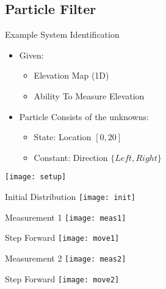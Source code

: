 \subsection{Particle Filter}
\begin{frame}{Example System Identification}
\begin{itemize}
\item Given:
    \begin{itemize}
    \item Elevation Map (1D)
    \item Ability To Measure Elevation
    \end{itemize}
\item Particle Consists of the unknowns:
    \begin{itemize}
    \item State: Location  $[0, 20]$
    \item Constant: Direction  $\{Left, Right\}$
    \end{itemize}
\end{itemize}

\begin{center}
\texttt{[image: setup]}
\end{center}
\end{frame}

\begin{frame}{Initial Distribution}
\centering
\texttt{[image: init]}\\
\end{frame}

\begin{frame}{Measurement 1}
\centering
\texttt{[image: meas1]}\\
\end{frame}

\begin{frame}{Step Forward}
\centering
\texttt{[image: move1]}\\
\end{frame}

\begin{frame}{Measurement 2}
\centering
\texttt{[image: meas2]}\\
\end{frame}

\begin{frame}{Step Forward}
\centering
\texttt{[image: move2]}\\
\end{frame}

